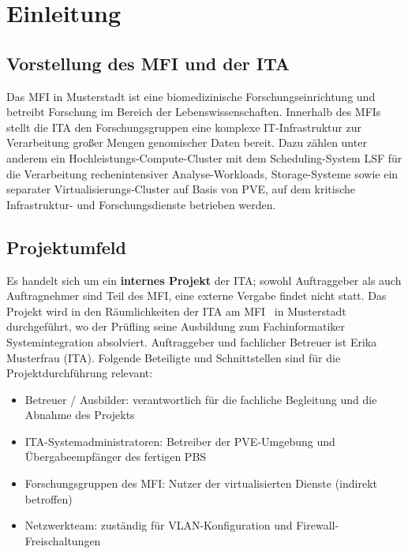 \section{Einleitung}
\label{sec:Einleitung}

\subsection{Vorstellung des MFI und der ITA}
\label{sec:Vorstellung_MFI}
Das \ac{MFI} in Musterstadt ist eine
biomedizinische Forschungseinrichtung und betreibt
Forschung im Bereich der Lebenswissenschaften.
Innerhalb des MFIs stellt die \ac{ITA} den Forschungsgruppen eine
komplexe IT-Infrastruktur zur Verarbeitung großer Mengen genomischer
Daten bereit.
Dazu zählen unter anderem ein Hochleistungs-Compute-Cluster mit dem
Scheduling-System \ac{LSF} für die Verarbeitung rechenintensiver
Analyse-Workloads, Storage-Systeme sowie ein separater
Virtualisierungs-Cluster auf Basis von \ac{PVE}, auf dem kritische
Infrastruktur- und Forschungsdienste betrieben werden.

\subsection{Projektumfeld}
\label{sec:Projektumfeld}
Es handelt sich um ein \textbf{internes Projekt} der \ac{ITA}; sowohl
Auftraggeber als auch Auftragnehmer sind Teil des \ac{MFI}, eine
externe Vergabe findet nicht statt.
Das Projekt wird in den Räumlichkeiten der \ac{ITA} am \ac{MFI}~\citep{FirmaWebsite} in Musterstadt
durchgeführt, wo der Prüfling seine Ausbildung zum Fachinformatiker
Systemintegration absolviert.
Auftraggeber und fachlicher Betreuer ist Erika Musterfrau (\ac{ITA}).
Folgende Beteiligte und Schnittstellen sind für die Projektdurchführung
relevant:
\begin{itemize}
    \item Betreuer / Ausbilder: verantwortlich für die fachliche Begleitung und die Abnahme des Projekts
    \item \ac{ITA}-Systemadministratoren: Betreiber der \ac{PVE}-Umgebung und Übergabeempfänger des fertigen \ac{PBS}
    \item Forschungsgruppen des \ac{MFI}: Nutzer der virtualisierten Dienste (indirekt betroffen)
    \item Netzwerkteam: zuständig für \ac{VLAN}-Konfiguration und Firewall-Freischaltungen
\end{itemize}

